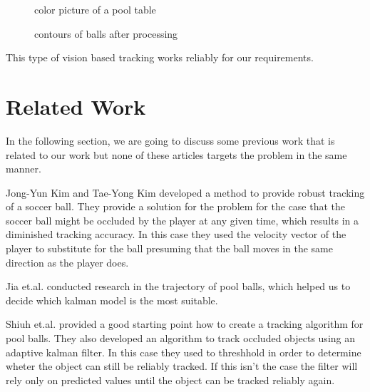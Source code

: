\documentclass[notitlepage, a4paper, 11pt]{scrartcl}
\begin{document}
\begin{multicols}{2}
\begin{figure}[H]
    \centering
    \caption{color picture of a pool table}
    \label{pic:pool-color}
\end{figure}

\begin{figure}[H]
    \centering
    \caption{contours of balls after processing}
    \label{pic:pool-bw}
\end{figure}

This type of vision based tracking works reliably for our requirements.

\section{Related Work}

In the following section, we are going to discuss some previous work that is related to our work but none of these articles targets the problem in the same manner.

Jong-Yun Kim and Tae-Yong Kim \cite{kim} developed a method to provide robust tracking of a soccer ball. 
They provide a solution for the problem for the case that the soccer ball might be occluded by the player at any given time,
which results in a diminished tracking accuracy. 
In this case they used the velocity vector of the player to substitute for the ball presuming that the ball moves in the same direction as the player does.

Jia et.al. \cite{jia} conducted research in the trajectory of pool balls, which helped us to decide which kalman model is the most suitable.

Shiuh et.al. \cite{shiuh} provided a good starting point how to create a tracking algorithm for pool balls. They also developed an algorithm to track occluded objects using an adaptive kalman filter.
In this case they used to threshhold in order to determine wheter the object can still be reliably tracked. If this isn't the case the filter will rely only on predicted values until the object can be tracked reliably again.


\end{multicols}
\end{document}
